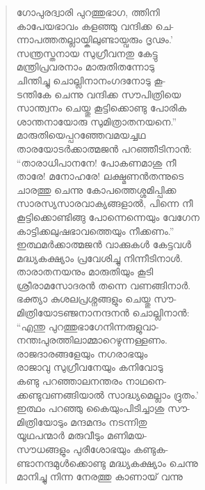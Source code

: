 \begin{verse}
ഗോപുരദ്വാരി പുറത്തുഭാഗ, ത്തിനി\\
കാപേയഭാവം കളഞ്ഞു വന്ദിക്ക ചെ-\\
ന്നാപത്തതല്ലായ്കിലുണ്ടായ്വരും ദൃഢം.’\\
സന്ത്രസ്തനായ സുഗ്രീവനതു കേട്ടു\\
മന്ത്രിപ്രവരനാം മാരുതിതന്നോടു\\
ചിന്തിച്ചു ചൊല്ലിനാനംഗദനോടു കൂ-\\
ടന്തികേ ചെന്നു വന്ദിക്ക സൗപിത്രിയെ\\
സാന്ത്വനം ചെയ്തു കൂട്ടിക്കൊണ്ടു പോരിക\\
ശാന്തനായോരു സുമിത്രാതനയനെ.”\\
മാരുതിയെപ്പറഞ്ഞേവമയച്ചഥ\\
താരയോടര്‍ക്കാത്മജന്‍ പറഞ്ഞീടിനാന്‍:\\
“താരാധിപാനനേ! പോകണമാശു നീ\\
താരേ! മനോഹരേ! ലക്ഷ്മണന്‍തന്നുടെ\\
ചാരത്തു ചെന്നു കോപത്തെശ്ശമിപ്പിക്ക\\
സാരസ്യസാരവാക്യങ്ങളാല്‍, പിന്നെ നീ\\
കൂട്ടിക്കൊണ്ടിങ്ങു പോന്നെന്നെയും വേഗേന\\
കാട്ടിക്കലുഷഭാവത്തെയും നീക്കണം.”\\
ഇത്ഥമര്‍ക്കാത്മജന്‍ വാക്കുകള്‍ കേട്ടവള്‍\\
മദ്ധ്യകക്ഷ്യാം പ്രവേശിച്ചു നിന്നീടിനാള്‍.\\
താരാതനയനും മാരുതിയും കൂടി\\
ശ്രീരാമസോദരന്‍ തന്നെ വണങ്ങിനാര്‍.\\
ഭക്ത്യാ കുശലപ്രശ്നങ്ങളും ചെയ്തു സൗ-\\
മിത്രിയോടഞ്ജനാനന്ദനന്‍ ചൊല്ലിനാന്‍:\\
“എന്തു പുറത്തുഭാഗേനിന്നരുളുവാ-\\
നന്തഃപുരത്തിലാമ്മാറെഴുന്നള്ളണം.\\
രാജദാരങ്ങളേയും നഗരാഭയും\\
രാജാവു സുഗ്രീവനേയും കനിവോടു\\
കണ്ടു പറഞ്ഞാലനന്തരം നാഥനെ-\\
ക്കണ്ടുവണങ്ങിയാല്‍ സാദ്ധ്യമെല്ലാം ദ്രുതം.’\\
ഇത്ഥം പറഞ്ഞു കൈയുംപിടിച്ചാശു സൗ-\\
മിത്രിയോടും മന്ദമന്ദം നടന്നിതു\\
യൂഥപന്മാര്‍ മരുവീടും മണിമയ-\\
സൗധങ്ങളും പുരീശോഭയും കണ്ടുക-\\
ണ്ടാനന്ദമുള്‍ക്കൊണ്ടു മദ്ധ്യകക്ഷ്യാം ചെന്നു\\
മാനിച്ചു നിന്ന നേരത്തു കാണായ് വന്നു\\

\end{verse}
